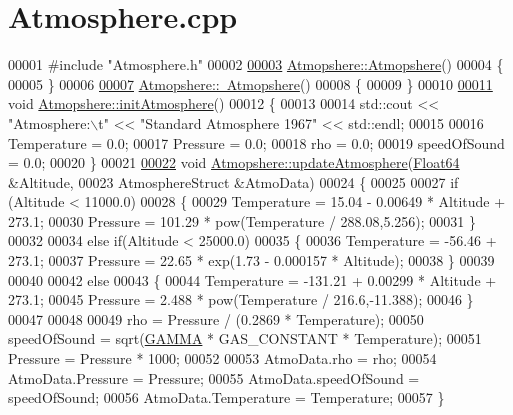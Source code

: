 \hypertarget{_atmosphere_8cpp_source}{}\section{Atmosphere.\+cpp}
\label{_atmosphere_8cpp_source}

\begin{DoxyCode}
00001 \textcolor{preprocessor}{#include "Atmosphere.h"}
00002 
\hyperlink{group___atmosphere_a77ca553d3c4e855dd921a451d65cc313}{00003} \hyperlink{group___atmosphere_a77ca553d3c4e855dd921a451d65cc313}{Atmopshere::Atmopshere}()
00004 \{
00005 \}
00006 
\hyperlink{group___atmosphere_ac7815ca8008ed54dc758f2bf7a6104f7}{00007} \hyperlink{group___atmosphere_ac7815ca8008ed54dc758f2bf7a6104f7}{Atmopshere::~Atmopshere}()
00008 \{
00009 \}
00010 
\hyperlink{group___atmosphere_a6e1d5763fbb6631784c99ee3c88911bd}{00011} \textcolor{keywordtype}{void} \hyperlink{group___atmosphere_a6e1d5763fbb6631784c99ee3c88911bd}{Atmopshere::initAtmosphere}()
00012 \{
00013 
00014     std::cout << \textcolor{stringliteral}{"Atmosphere:\(\backslash\)t"} << \textcolor{stringliteral}{"Standard Atmosphere 1967"} << std::endl;
00015 
00016     Temperature     = 0.0;  
00017     Pressure        = 0.0;       
00018     rho             = 0.0;          
00019     speedOfSound    = 0.0;   
00020 \}
00021 
\hyperlink{group___atmosphere_a2bd97471d32725d6196ee6816ea36c99}{00022} \textcolor{keywordtype}{void} \hyperlink{group___atmosphere_a2bd97471d32725d6196ee6816ea36c99}{Atmopshere::updateAtmosphere}(\hyperlink{group___tools_ga3f1431cb9f76da10f59246d1d743dc2c}{Float64} &Altitude, 
00023                                   AtmosphereStruct &AtmoData)
00024 \{
00025 
00027     \textcolor{keywordflow}{if} (Altitude < 11000.0)
00028     \{
00029         Temperature = 15.04 - 0.00649 * Altitude + 273.1;
00030         Pressure = 101.29 * pow(Temperature / 288.08,5.256);
00031     \}
00032 
00034     \textcolor{keywordflow}{else} \textcolor{keywordflow}{if}(Altitude < 25000.0)
00035     \{
00036                 Temperature = -56.46 + 273.1;
00037                 Pressure = 22.65 * exp(1.73 - 0.000157 * Altitude);
00038     \}
00039 
00040 
00042     \textcolor{keywordflow}{else}
00043     \{ 
00044             Temperature = -131.21 + 0.00299 * Altitude + 273.1;
00045             Pressure = 2.488 * pow(Temperature / 216.6,-11.388);
00046     \}
00047         
00048 
00049             rho          = Pressure / (0.2869 * Temperature);           
00050             speedOfSound = sqrt(\hyperlink{group___tools_ga6e7b8e4a71fb3f6d37718ac5d614f560}{GAMMA} * GAS\_CONSTANT * Temperature);
00051             Pressure     = Pressure * 1000;
00052 
00053             AtmoData.rho = rho;
00054             AtmoData.Pressure = Pressure;
00055             AtmoData.speedOfSound = speedOfSound;
00056             AtmoData.Temperature = Temperature;
00057 \}
\end{DoxyCode}
